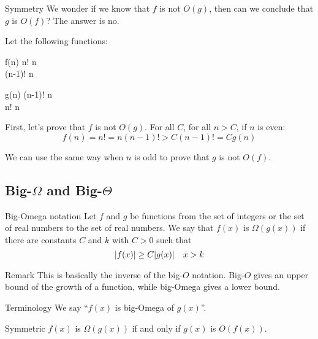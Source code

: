 \documentclass[a4paper]{article}
\begin{document}
\begin{parag}{Symmetry}
    We wonder if we know that $f$ is not $O\left(g\right)$, then can we conclude that $g$ is $O\left(f\right)$? The answer is no.

    Let the following functions:
    \begin{functionbypart}{f\left(n\right)}
        n! \mathspace {} n  \\
        \left(n-1\right)! \mathspace {} n 
    \end{functionbypart}

    \begin{functionbypart}{g\left(n\right)}
        \left(n-1\right)! \mathspace {} n  \\
        n! \mathspace {} n 
    \end{functionbypart}

    First, let's prove that $f$ is not $O\left(g\right)$. For all $C$, for all $n > C$, if $n$ is even:
    \[f\left(n\right) = n! = n\left(n-1\right)! > C\left(n - 1\right)! = Cg\left(n\right)\]

    We can use the same way when $n$ is odd to prove that $g$ is not $O\left(f\right)$.
\end{parag}

\subsection{Big-$\Omega$ and Big-$\Theta$}
\begin{parag}{Big-Omega notation}
    Let $f$ and $g$ be functions from the set of integers or the set of real numbers to the set of real numbers. We say that $f\left(x\right)$ is $\Omega\left(g\left(x\right)\right)$ if there are constants $C$ and $k$ with $C > 0$ such that
    \[\left|f\left(x\right)\right| \geq C\left|g\left(x\right)\right| \mathspace x > k\]

    \begin{subparag}{Remark}
        This is basically the inverse of the big-$O$ notation. Big-$O$ gives an upper bound of the growth of a function, while big-Omega gives a lower bound.
    \end{subparag}

    \begin{subparag}{Terminology}
        We say ``$f\left(x\right)$ is big-Omega of $g\left(x\right)$''.
    \end{subparag}

    \begin{subparag}{Symmetric}
        $f\left(x\right)$ is $\Omega\left(g\left(x\right)\right)$ if and only if $g\left(x\right)$ is $O\left(f\left(x\right)\right)$.
    \end{subparag}
\end{parag}
\end{document}
